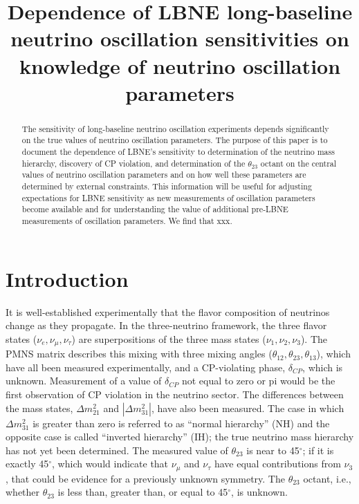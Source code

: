 \documentclass[letterpaper,11pt]{article}
\author{}
\title{Dependence of LBNE long-baseline neutrino oscillation 
sensitivities on knowledge of neutrino oscillation parameters}
\newcommand{\nue}{\mbox{$\nu_e$}}
\newcommand{\numu}{\mbox{$\nu_{\mu}$}}
\newcommand{\nutau}{\mbox{$\nu_{\tau}$}}
\newcommand{\degs}{\mbox{$^{\circ}$}}
\newcommand{\thetaonetwo}{\mbox{$\theta_{12}$}}
\newcommand{\thetatwothree}{\mbox{$\theta_{23}$}}
\newcommand{\thetaonethree}{\mbox{$\theta_{13}$}}
\newcommand{\dcp}{\mbox{$\delta_{CP}$}}
\newcommand{\dmsq}{\mbox{$\Delta m^{2}_{21}$}}
\newcommand{\Dmsq}{\mbox{$\Delta m^{2}_{31}$}}
\begin{document}
\maketitle

\begin{abstract}
The sensitivity of long-baseline neutrino oscillation experiments
depends significantly on the true values of neutrino oscillation parameters.
The purpose of this paper is to document the dependence of LBNE's sensitivity
to determination of the neutrino mass hierarchy, discovery of CP violation,
and determination of the $\thetatwothree$ octant on the central values
of neutrino oscillation parameters and on how well these parameters are
determined by external constraints. This information will be useful for
adjusting expectations for LBNE sensitivity as new measurements of oscillation
parameters become available and for understanding the value of additional
pre-LBNE measurements of oscillation parameters. We find that xxx.
\end{abstract}

\section{Introduction}
It is well-established experimentally that the flavor composition
of neutrinos change as they propagate\cite{Beringer:1900zz}. In the three-neutrino 
framework, the three flavor states ($\nue,\numu,\nutau$) are superpositions 
of the three mass states ($\nu_1,\nu_2,\nu_3$). The PMNS\cite{pmns1,pmns2,pmns3}
matrix describes this mixing with three mixing angles 
($\thetaonetwo,\thetatwothree,\thetaonethree$), which have all been
measured experimentally, and a CP-violating phase,
$\dcp$, which is unknown. 
Measurement of a value of $\dcp$ not equal to 
zero or pi would be the first observation of CP violation in the neutrino
sector.
The differences between the mass states, 
$\dmsq$ and $|\Dmsq|$, have also been measured.
The case in which $\Dmsq$ is greater than zero is referred to as 
``normal hierarchy'' (NH) and the opposite case is called ``inverted
hierarchy'' (IH); the true neutrino mass hierarchy has not yet been determined.
The measured value of $\thetatwothree$ is near 
to 45$\degs$;
if it is exactly 45$\degs$, which would indicate that 
$\nu_{\mu}$ and $\nu_{\tau}$ have equal contributions from $\nu_3$,
that could be evidence for a previously unknown symmetry. 
The $\thetatwothree$
octant, i.e., whether $\thetatwothree$ is less than, greater than, or
equal to 45$\degs$, is unknown.
\end{document}
